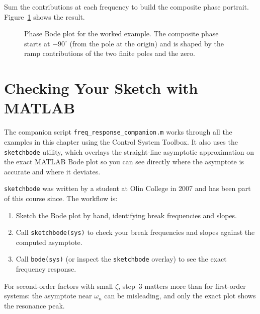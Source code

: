 \documentclass[12pt]{article}
\newcommand{\figplaceholder}[2][3in]{%
  \begin{center}
  \fbox{\parbox{#1}{\centering\vspace{0.5in}\textit{[Figure: #2]}\vspace{0.5in}}}
  \end{center}
}
\begin{document}
Sum the contributions at each frequency to build the composite phase portrait.
Figure~\ref{fig:example_phase} shows the result.

\begin{figure}[htbp]
  \figplaceholder[5.5in]{Bode phase plot for $G(s)=K(s+3)/[s(s+1)(s+2)]$:
    (a)~individual component ramps starting from the $-90^\circ$ offset;
    (b)~composite phase. [Nise Fig.~10.12]}
  \caption{Phase Bode plot for the worked example.  The composite phase starts
    at $-90^\circ$ (from the pole at the origin) and is shaped by the ramp
    contributions of the two finite poles and the zero.}
  \label{fig:example_phase}
\end{figure}

\section{Checking Your Sketch with MATLAB}
\label{sec:matlab}

The companion script \texttt{freq\_response\_companion.m} works through all
the examples in this chapter using the Control System Toolbox.  It also uses
the \texttt{sketchbode} utility, which overlays the straight-line asymptotic
approximation on the exact MATLAB Bode plot so you can see directly where the
asymptote is accurate and where it deviates.

\texttt{sketchbode} was written by a student at Olin College in 2007 and has
been part of this course since.  The workflow is:
\begin{enumerate}
  \item Sketch the Bode plot by hand, identifying break frequencies and slopes.
  \item Call \texttt{sketchbode(sys)} to check your break frequencies and
    slopes against the computed asymptote.
  \item Call \texttt{bode(sys)} (or inspect the \texttt{sketchbode} overlay)
    to see the exact frequency response.
\end{enumerate}

For second-order factors with small $\zeta$, step~3 matters more than for
first-order systems: the asymptote near $\omega_n$ can be misleading, and
only the exact plot shows the resonance peak.
\end{document}
